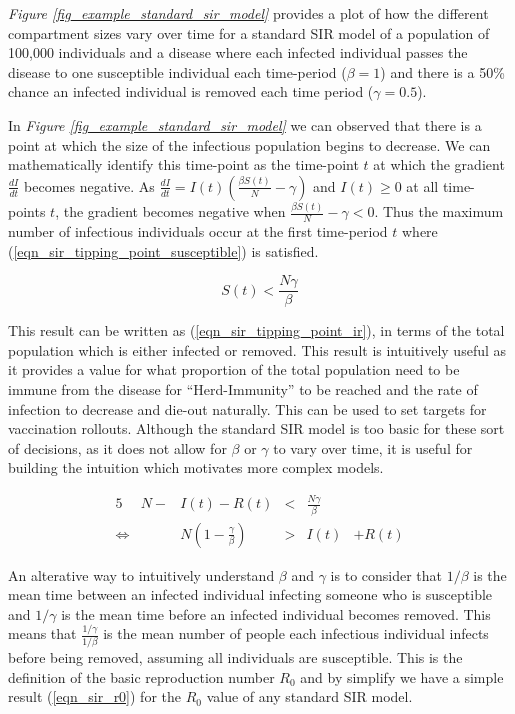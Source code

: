 \documentclass[11pt,a4paper]{article}
\theoremstyle{break}
\begin{document}
  \par \textit{Figure \ref{fig_example_standard_sir_model}} provides a plot of how the different compartment sizes vary over time for a standard SIR model of a population of 100,000 individuals and a disease where each infected individual passes the disease to one susceptible individual each time-period ($\beta=1$) and there is a 50\% chance an infected individual is removed each time period ($\gamma=0.5$).

  \par In \textit{Figure \ref{fig_example_standard_sir_model}} we can observed that there is a point at which the size of the infectious population begins to decrease. We can mathematically identify this time-point as the time-point $t$ at which the gradient $\frac{dI}{dt}$ becomes negative. As $\frac{dI}{dt}=I(t)\left(\frac{\beta S(t)}N-\gamma\right)$ and $I(t)\geq0$ at all time-points $t$, the gradient becomes negative when $\frac{\beta S(t)}N-\gamma<0$. Thus the maximum number of infectious individuals occur at the first time-period $t$ where (\ref{eqn_sir_tipping_point_susceptible}) is satisfied.

  \begin{equation}\label{eqn_sir_tipping_point_susceptible}
    S(t)<\frac{N\gamma}\beta
  \end{equation}

  \par This result can be written as (\ref{eqn_sir_tipping_point_ir}), in terms of the total population which is either infected or removed. This result is intuitively useful as it provides a value for what proportion of the total population need to be immune from the disease for ``Herd-Immunity'' to be reached and the rate of infection to decrease and die-out naturally. This can be used to set targets for vaccination rollouts. Although the standard SIR model is too basic for these sort of decisions, as it does not allow for $\beta$ or $\gamma$ to vary over time, it is useful for building the intuition which motivates more complex models.

  \begin{alignat}{5}
    &N-&I(t)-R(t)& < &\frac{N\gamma}\beta\nonumber&\\
    \Longleftrightarrow&&N\left(1-\frac\gamma\beta\right)& > &I(t)&+R(t)\label{eqn_sir_tipping_point_ir}
  \end{alignat}

  \par An alterative way to intuitively understand $\beta$ and $\gamma$ is to consider that $1/\beta$ is the mean time between an infected individual infecting someone who is susceptible and $1/\gamma$ is the mean time before an infected individual becomes removed. This means that $\frac{1/\gamma}{1/\beta}$ is the mean number of people each infectious individual infects before being removed, assuming all individuals are susceptible. This is the definition of the basic reproduction number $R_0$ and by simplify we have a simple result (\ref{eqn_sir_r0}) for the $R_0$ value of any standard SIR model.
\end{document}
